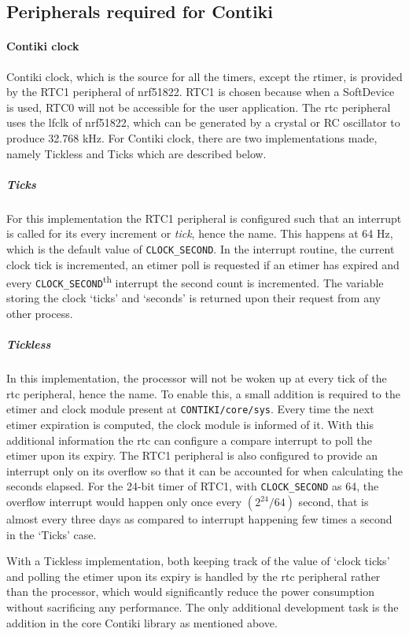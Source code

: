 \subsection{Peripherals required for Contiki}\label{peripheralsContiki}
\paragraph{Contiki clock}
Contiki clock, which is the source for all the timers, except the rtimer, is provided by the RTC1 peripheral of nrf51822. RTC1 is chosen because when a SoftDevice is used, RTC0 will not be accessible for the user application. The \gls{rtc} peripheral uses the \gls{lfclk} of nrf51822, which can be generated by a crystal or RC oscillator to produce 32.768 kHz. For Contiki clock, there are two implementations made, namely Tickless and Ticks which are described below. 

\subparagraph{Ticks}
For this implementation the RTC1 peripheral is configured such that an interrupt is called for its every increment or \emph{tick}, hence the name. This happens at 64 Hz, which is the default value of \texttt{CLOCK\_SECOND}. In the interrupt routine, the current clock tick is incremented, an etimer poll is requested if an etimer has expired and every \texttt{CLOCK\_SECOND}\textsuperscript{th} interrupt the second count is incremented. The variable storing the clock `ticks' and `seconds' is returned upon their request from any other process.

\subparagraph{Tickless}
In this implementation, the processor will not be woken up at every tick of the \gls{rtc} peripheral, hence the name. To enable this, a small addition is required to the etimer and clock module present at \texttt{CONTIKI/core/sys}. Every time the next etimer expiration is computed, the clock module is informed of it. With this additional information the \gls{rtc} can configure a compare interrupt to poll the etimer upon its expiry. The RTC1 peripheral is also configured to provide an interrupt only on its overflow so that it can be accounted for when calculating the seconds elapsed. For the 24-bit timer of RTC1, with \texttt{CLOCK\_SECOND} as 64, the overflow interrupt would happen only once every $(2^{24}/64)$ second, that is almost every three days as compared to interrupt happening few times a second in the `Ticks' case. 

With a Tickless implementation, both keeping track of the value of `clock ticks' and polling the etimer upon its expiry is handled by the \gls{rtc} peripheral rather than the processor, which would significantly reduce the power consumption without sacrificing any performance. The only additional development task is the addition in the core Contiki library as mentioned above.

